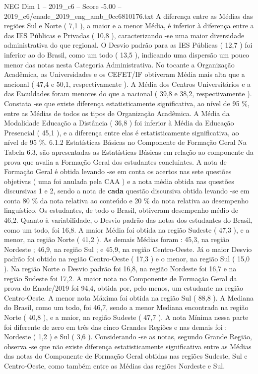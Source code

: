 \begin{textsample}{NEG Dim 1 – 2019\_c6 – Score -5.00 – 2019\_c6/enade\_2019\_eng\_amb\_0cc6810176.txt}
A diferença entre as Médias das regiões Sul e Norte ( 7,1 ), a maior e a menor Média, é inferior à diferença entre a das IES Públicas e Privadas ( 10,8 ), caracterizando -se uma maior diversidade administrativa do que regional.
O Desvio padrão para as IES Públicas ( 12,7 ) foi inferior ao do Brasil, como um todo ( 13,5 ), indicando uma dispersão um pouco menor das notas nesta Categoria Administrativa.
No tocante a Organização Acadêmica, as Universidades e os CEFET/IF obtiveram Média mais alta que a nacional ( 47,4 e 50,1, respectivamente ).
A Média dos Centros Universitários e a das Faculdades foram menores do que a nacional ( 39,8 e 38,2, respectivamente ).
Constata -se que existe diferença estatisticamente significativa, ao nível de 95 \%, entre as Médias de todos os tipos de Organização Acadêmica.
A Média da Modalidade Educação a Distância ( 36,8 ) foi inferior à Média da Educação Presencial ( 45,1 ), e a diferença entre elas é estatisticamente significativa, ao nível de 95 \%. 6.1.2 Estatísticas Básicas no Componente de Formação Geral Na Tabela 6.3, são apresentadas as Estatísticas Básicas em relação ao componente da prova que avalia a Formação Geral dos estudantes concluintes.
A nota de Formação Geral é obtida levando -se em conta os acertos nas sete questões objetivas ( uma foi anulada pela CAA ) e a nota média obtida nas questões discursivas 1 e 2, sendo a nota de \textbf{cada} questão discursiva obtida levando -se em conta 80 \% da nota relativa ao conteúdo e 20 \% da nota relativa ao desempenho linguístico.
Os estudantes, de todo o Brasil, obtiveram desempenho médio de 46,2.
Quanto à variabilidade, o Desvio padrão das notas dos estudantes do Brasil, como um todo, foi 16,8.
A maior Média foi obtida na região Sudeste ( 47,3 ), e a menor, na região Norte ( 41,2 ).
As demais Médias foram : 45,3, na região Nordeste ; 46,9, na região Sul ; e 45,9, na região Centro-Oeste.
Já o maior Desvio padrão foi obtido na região Centro-Oeste ( 17,3 ) e o menor, na região Sul ( 15,0 ).
Na região Norte o Desvio padrão foi 16,8, na região Nordeste foi 16,7 e na região Sudeste foi 17,2.
A maior nota no Componente de Formação Geral da prova do Enade/2019 foi 94,4, obtida por, pelo menos, um estudante na região Centro-Oeste.
A menor nota Máxima foi obtida na região Sul ( 88,8 ).
A Mediana do Brasil, como um todo, foi 46,7, sendo a menor Mediana encontrada na região Norte ( 40,8 ), e a maior, na região Sudeste ( 47,7 ).
A nota Mínima nessa parte foi diferente de zero em três das cinco Grandes Regiões e nas demais foi : Nordeste ( 1,2 ) e Sul ( 3,6 ).
Considerando -se as notas, segundo Grande Região, observa -se que não existe diferença estatisticamente significativa entre as Médias das notas do Componente de Formação Geral obtidas nas regiões Sudeste, Sul e Centro-Oeste, como também entre as Médias das regiões Nordeste e Sul.

\end{textsample}
